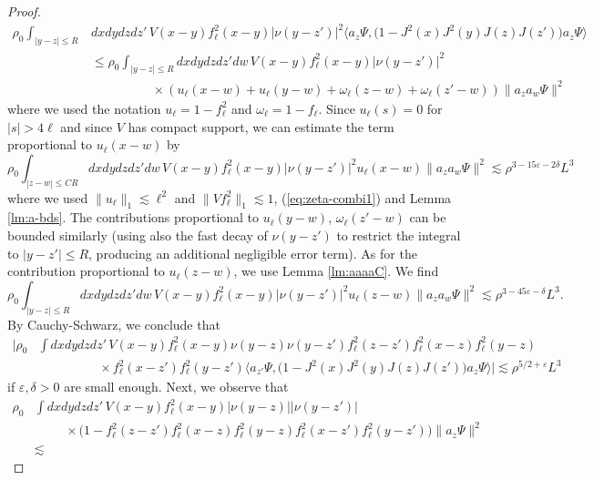 \documentclass[a4paper,11pt]{article}
\def\eps{\varepsilon}
\numberwithin{equation}{section}
\begin{document}
\begin{proof}
\[ \begin{split} \rho_0 \int_{|y-z| \leq R} &dx dy dz dz' \, V(x-y) f_\ell^2(x-y)| \nu (y-z')|^2  \big\langle a_z \Psi, \big( 1 - J^2 (x) J^2 (y) J(z) J(z') \big) a_z \Psi \big\rangle  \\ &\leq \rho_0 \int_{|y-z| \leq R} dx dy dz dz' dw \, V(x-y) f_\ell^2(x-y) |\nu (y-z')|^2 \\ & \hspace{2cm} \times ( u_\ell (x-w) + u_\ell (y-w) + \omega_\ell (z-w) + \omega_\ell (z' - w))  \| a_z a_w \Psi \|^2  \end{split} \]
where we used the notation $u_\ell = 1-f_\ell^2$ and $\omega_\ell = 1- f_\ell$. Since $u_\ell (s) = 0$ for $|s| > 4\ell$ and since $V$ has compact support, we can estimate the term proportional to $u_\ell (x-w)$ by 
\[ \rho_0  \int_{|z-w| \leq C R} dx dy dz dz' dw \, V(x-y) f_\ell^2(x-y)| \nu (y-z')|^2 u_\ell (x-w) \| a_z a_w \Psi \|^2 \lesssim \rho^{3-15\eps-2\delta} L^3 \]
where we used $\| u_\ell \|_1 \lesssim \ell^2$ and $\|Vf_\ell^2\|_1\lesssim 1$, (\ref{eq:zeta-combi1}) and Lemma \ref{lm:a-bds}. The contributions proportional to $u_\ell (y-w)$, $\omega_\ell (z'-w)$ can be bounded similarly (using also the fast decay of $\nu (y-z')$ to restrict the integral to $|y-z'| \leq R$, producing an additional negligible error term). As for the contribution proportional to $u_\ell (z-w)$, we use Lemma \ref{lm:aaaaC}. We find 
\[ \rho_0 \int_{|y-z| \leq R} dx dy dz dz' dw \,V(x-y)f_\ell^2(x-y) |\nu (y-z')|^2 u_\ell (z-w) \| a_z a_w \Psi \|^2 \lesssim \rho^{3-45\eps-\delta} L^3. \]
By Cauchy-Schwarz, we conclude that 
\[ \begin{split} \Big| \rho_0 &\int dx dy dz dz' \, V(x-y) f_\ell^2 (x-y) \nu (y-z) \nu (y-z')  f_\ell^2 (z-z')  f_\ell^2(x-z) f_\ell^2(y-z)  \\ &\hspace{2cm} \times f_\ell^2 (x-z') f_\ell^2(y-z') \langle a_{z'} \Psi ,  \big( 1- J^2 (x) J^2 (y) J(z) J(z')  \big) a_z \Psi \rangle \Big| \lesssim \rho^{5/2+\eps} L^3\end{split} \]
if $\eps, \delta > 0$ are small enough. Next, we observe that
 \begin{equation}\label{eq:phi31-f} 
 \begin{split} \rho_0 &\int dx dy dz dz' \, V(x-y) f_\ell^2(x-y)|\nu (y-z)| |\nu (y-z')| \\ &\hspace{1cm} \times \big( 1 - f_\ell^2 (z-z')  f_\ell^2(x-z) f_\ell^2(y-z) f_\ell^2 (x-z') f_\ell^2(y-z') \big) \| a_z \Psi \|^2 \\ &\lesssim 

\end{split}
\end{equation}
\end{proof}
\end{document}
